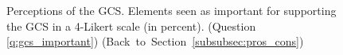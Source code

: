 \begin{figure}[h!]
    \caption[Perceptions of the GCS]{Perceptions of the GCS. Elements seen as important for supporting the GCS in a 4-Likert scale (in percent). (Question \ref{q:gcs_important})  \hfill (Back~to~Section~\ref{subsubsec:pros_cons})}\label{fig:gcs_important}
\end{figure}

